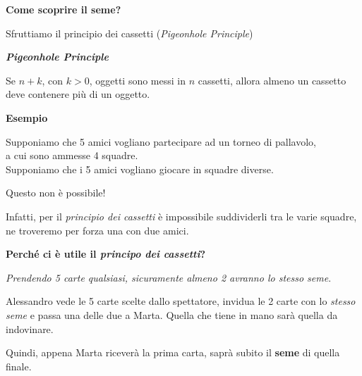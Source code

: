 \documentclass[8pt]{beamer}
\theoremstyle{plain}
\theoremstyle{definition}
\begin{document}
\begin{frame}\begin{center}
\textbf{Come scoprire il seme?}

\bigskip
\bigskip

Sfruttiamo il principio dei cassetti (\textit{Pigeonhole Principle})

\medskip

\center\textbf{\textit{Pigeonhole Principle}}

\begin{block}

Se $n+k$, con $k>0$, oggetti sono messi in $n$ cassetti, allora almeno un cassetto deve contenere più di un oggetto.
% 
% 
\end{block}
\end{center}
\end{frame}

\begin{frame}\begin{center}
\textbf{Esempio}

\bigskip
\medskip

Supponiamo che 5 amici vogliano partecipare ad un torneo di pallavolo, \\a cui sono ammesse 4 squadre. \\Supponiamo che i 5 amici vogliano giocare in squadre diverse. 

\smallskip

Questo non è possibile!

\smallskip

Infatti, per il \textit{principio dei cassetti} è impossibile suddividerli tra le varie squadre, \\ne troveremo per forza una con due amici.
\end{center}
\end{frame}

\begin{frame}\begin{center}
\textbf{Perché ci è utile il \emph{principo dei cassetti}?}

\medskip
\medskip
\medskip

\emph{Prendendo 5 carte qualsiasi, sicuramente almeno 2 avranno lo stesso seme}.


Alessandro vede le 5 carte scelte dallo spettatore, invidua le 2 carte con lo \textit{stesso seme} e passa una delle due a Marta. Quella che tiene in mano sarà quella da indovinare.

\bigskip

Quindi, appena Marta riceverà la prima carta, saprà subito il \textbf{seme} di quella finale.
\end{center}
\end{frame}
\end{document}
